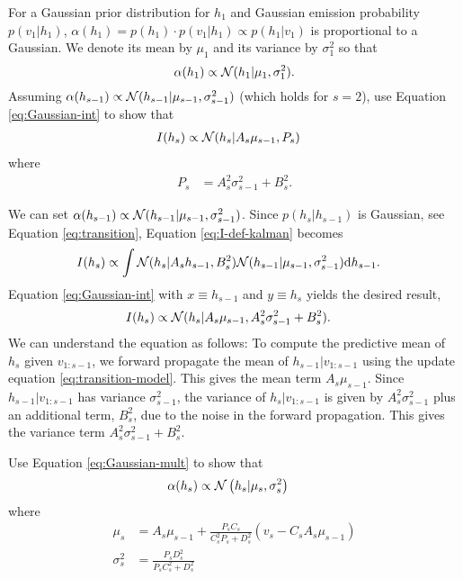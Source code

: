 \begin{exenumerate}
  For a Gaussian prior distribution for $h_1$ and Gaussian emission
  probability $p(v_1 | h_1)$, $\alpha(h_1) = p(h_1) \cdot p(v_1 | h_1)
  \propto p(h_1 | v_1)$ is proportional to a Gaussian. We denote its
  mean by $\mu_1$ and its variance by $\sigma_1^2$ so that
  \begin{equation}
    \alpha(h_1) \propto \mathcal{N}(h_1 | \mu_1, \sigma_1^2).
  \end{equation}
  Assuming $\alpha(h_{s-1}) \propto \mathcal{N}(h_{s-1} | \mu_{s-1}, \sigma_{s-1}^2)$ (which holds for $s=2$), use Equation \eqref{eq:Gaussian-int} to show that
  \begin{align}
    I(h_s) & \propto \mathcal{N}(h_s | A_s \mu_{s-1}, P_s)
  \end{align}
  where
  \begin{align}
    P_s & = A^2_s \sigma^2_{s-1} + B_s^2.
  \end{align}
  
  \begin{solution}
    We can set $\alpha(h_{s-1}) \propto \mathcal{N}(h_{s-1} | \mu_{s-1}, \sigma_{s-1}^2)$. Since $p(h_s | h_{s-1})$ is Gaussian, see Equation \eqref{eq:transition},  Equation \eqref{eq:I-def-kalman} becomes
    \begin{align}
      I(h_s) &\propto \int  \mathcal{N}(h_s | A_s h_{s-1}, B^2_s)  \mathcal{N}(h_{s-1} | \mu_{s-1}, \sigma_{s-1}^2) \mathrm{d} h_{s-1}.
    \end{align}
    Equation \eqref{eq:Gaussian-int} with $x \equiv h_{s-1}$ and $y \equiv h_s$ yields the desired result,
    \begin{align}
      I(h_s) &\propto  \mathcal{N}(h_s | A_s \mu_{s-1}, A_s^2 \sigma_{s-1}^2+B_s^2).
      \label{eq:prediction-Gaussian}
    \end{align}
    We can understand the equation as follows: To compute the
    predictive mean of $h_s $ given $v_{1:s-1}$, we forward propagate
    the mean of $h_{s-1} | v_{1:s-1}$ using the update equation
    \eqref{eq:transition-model}. This gives the mean term $A_s
    \mu_{s-1}$. Since $h_{s-1} | v_{1:s-1}$ has variance
    $\sigma_{s-1}^2$, the variance of $h_s | v_{1:s-1}$ is given by
    $A_s^2 \sigma_{s-1}^2$ plus an additional term, $B_s^2$, due to
    the noise in the forward propagation. This gives the variance term
    $A_s^2 \sigma_{s-1}^2+B_s^2$.
    
  \end{solution}

  \item Use Equation \eqref{eq:Gaussian-mult} to show that
  \begin{align}
    \alpha(h_s) & \propto \mathcal{N}\left(h_s | \mu_s , \sigma_s^2\right)
  \end{align}
  where
  \begin{align}
    \mu_s & =  A_s \mu_{s-1} + \frac{P_sC_s}{C_s^2 P_s+ D_s^2}\left(v_s - C_s A_s \mu_{s-1}\right)\\
     \sigma^2_s & =  \frac{P_s D_s^2}{P_s C_s^2+ D_s^2}
  \end{align}


\end{exenumerate}
